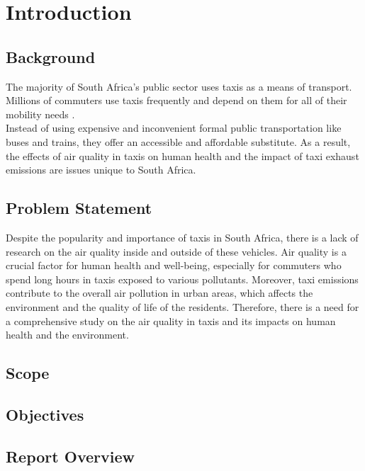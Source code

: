 \graphicspath{{introduction/fig/}}

\chapter{Introduction}
\label{chap:introduction}

\section{Background}
The majority of South Africa's public sector uses taxis as a means of transport. Millions of commuters use taxis frequently and depend on them for all of their mobility needs \cite{depttransport2023}.\\
Instead of using expensive and inconvenient formal public transportation like buses and trains, they offer an accessible and affordable substitute.
As a result, the effects of air quality in taxis on human health and the impact of taxi exhaust emissions are issues unique to South Africa.




\section{Problem Statement}
Despite the popularity and importance of taxis in South Africa, there is a lack of research on the air quality inside and outside of these vehicles. 
Air quality is a crucial factor for human health and well-being, especially for commuters who spend long hours in taxis exposed to various pollutants.
Moreover, taxi emissions contribute to the overall air pollution in urban areas, which affects the environment and the quality of life of the residents. 
Therefore, there is a need for a comprehensive study on the air quality in taxis and its impacts on human health and the environment.

\section{Scope}
\section{Objectives}
\section{Report Overview}


